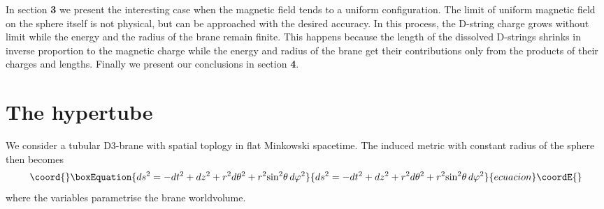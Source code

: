 \documentclass[a4paper,12pt]{article}
\begin{document}
In section {\bf 3} we present the interesting case when the magnetic field tends to a uniform configuration. The limit of uniform magnetic field on the sphere itself is not physical, but can be approached with the desired accuracy. In this process, the D-string charge grows without limit while the energy and the radius of the brane remain finite. This happens because the length of the dissolved D-strings shrinks in inverse proportion to the magnetic charge while the energy and radius of the brane get their contributions only from the products of their charges and lengths. Finally we present our conclusions in section {\bf 4}.


\section{The hypertube}

\noindent  

We consider a tubular D3-brane with \coordHE{} spatial toplogy in flat Minkowski spacetime. The induced metric with constant radius \coordHE{} of the sphere then becomes
\begin{equation}\coord{}\boxEquation{
ds^2=-dt^2+dz^2+r^2d{\theta}^2+r^2{\sin}^2\theta\,d{\varphi}^2
\label{bi1}
}{
ds^2=-dt^2+dz^2+r^2d{\theta}^2+r^2{\sin}^2\theta\,d{\varphi}^2
}{ecuacion}\coordE{}\end{equation}
where the variables \coordHE{} parametrise the brane worldvolume.
\end{document}

